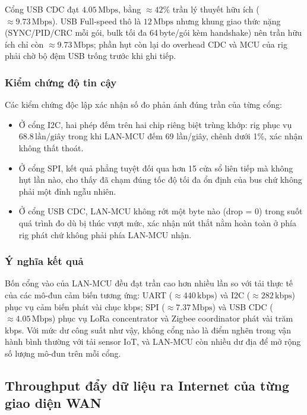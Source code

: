 Cổng USB CDC đạt $4{.}05\,\text{Mbps}$, bằng $\approx 42\%$ trần lý thuyết hữu ích ($\approx 9{.}73\,\text{Mbps}$). USB Full-speed thô là $12\,\text{Mbps}$ nhưng khung giao thức nặng (SYNC/PID/CRC mỗi gói, bulk tối đa 64\,byte/gói kèm handshake) nên trần hữu ích chỉ còn $\approx 9{.}73\,\text{Mbps}$; phần hụt còn lại do overhead CDC và MCU của rig phải chờ bộ đệm USB trống trước khi ghi tiếp.

\subsubsection{Kiểm chứng độ tin cậy}

Các kiểm chứng độc lập xác nhận số đo phản ánh đúng trần của từng cổng:
\begin{itemize}
    \item Ở cổng I2C, hai phép đếm trên hai chip riêng biệt trùng khớp: rig phục vụ $68{.}8\,\text{lần/giây}$ trong khi LAN-MCU đếm 69 lần/giây, chênh dưới 1\%, xác nhận không thất thoát.
    \item Ở cổng SPI, kết quả phẳng tuyệt đối qua hơn 15 cửa sổ liên tiếp mà không hụt lần nào, cho thấy đã chạm đúng tốc độ tối đa ổn định của bus chứ không phải một đỉnh ngẫu nhiên.
    \item Ở cổng USB CDC, LAN-MCU không rớt một byte nào (drop = 0) trong suốt quá trình đo dù bị thúc vượt mức, xác nhận nút thắt nằm hoàn toàn ở phía rig phát chứ không phải phía LAN-MCU nhận.
\end{itemize}

\subsubsection{Ý nghĩa kết quả}

Bốn cổng vào của LAN-MCU đều đạt trần cao hơn nhiều lần so với tải thực tế của các mô-đun cảm biến tương ứng: UART ($\approx 440\,\text{kbps}$) và I2C ($\approx 282\,\text{kbps}$) phục vụ cảm biến phát vài chục kbps; SPI ($\approx 7{.}37\,\text{Mbps}$) và USB CDC ($\approx 4{.}05\,\text{Mbps}$) phục vụ LoRa concentrator và Zigbee coordinator phát vài trăm kbps. Với mức dư công suất như vậy, không cổng nào là điểm nghẽn trong vận hành bình thường với tải sensor IoT, và LAN-MCU còn nhiều dư địa để mở rộng số lượng mô-đun trên mỗi cổng.

\subsection{Throughput đẩy dữ liệu ra Internet của từng giao diện WAN}
\label{subsec:bench_wan_egress}

